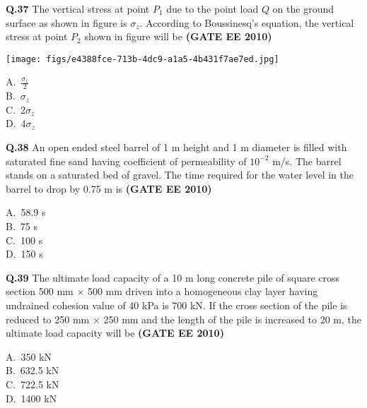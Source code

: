 \documentclass[journal,12pt,onecolumn]{exam}
\theoremstyle{remark}
\begin{document}
\noindent\textbf{Q.37} The vertical stress at point $P_1$ due to the point load $Q$ on the ground surface as shown in figure is $\sigma_z$. According to Boussinesq's equation, the vertical stress at point $P_2$ shown in figure will be
\hfill\textbf{(GATE EE 2010)}
\begin{center}
    
\texttt{[image: figs/e4388fce-713b-4dc9-a1a5-4b431f7ae7ed.jpg]}
\end{center}
\begin{multicols}{4}
A.\ $\frac{\sigma_z}{2}$ \\
B.\ $\sigma_z$ \\
C.\ $2\sigma_z$ \\
D.\ $4\sigma_z$
\end{multicols}

\noindent\textbf{Q.38} An open ended steel barrel of 1 m height and 1 m diameter is filled with saturated fine sand having coefficient of permeability of $10^{-2}$ m/s. The barrel stands on a saturated bed of gravel. The time required for the water level in the barrel to drop by 0.75 m is
\hfill\textbf{(GATE EE 2010)}
\begin{multicols}{4}
A.\ 58.9 s \\
B.\ 75 s \\
C.\ 100 s \\
D.\ 150 s
\end{multicols}

\noindent\textbf{Q.39} The ultimate load capacity of a 10 m long concrete pile of square cross section 500 mm $\times$ 500 mm driven into a homogeneous clay layer having undrained cohesion value of 40 kPa is 700 kN. If the cross section of the pile is reduced to 250 mm $\times$ 250 mm and the length of the pile is increased to 20 m, the ultimate load capacity will be
\hfill\textbf{(GATE EE 2010)}
\begin{multicols}{4}
A.\ 350 kN \\
B.\ 632.5 kN \\
C.\ 722.5 kN \\
D.\ 1400 kN
\end{multicols}

\setlength{\parindent}{0pt}
\setlength{\parskip}{0.5cm}
\end{document}
